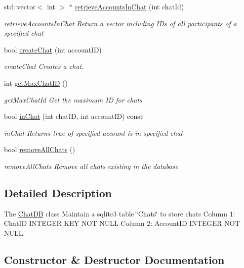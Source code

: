 \begin{DoxyCompactItemize}
std\+::vector$<$ int $>$ $\ast$ \hyperlink{classChatDB_af94ecd02f952a3a01b059f57651ac0a9}{retrieve\+Accounts\+In\+Chat} (int chat\+Id)
\begin{DoxyCompactList}\small\item\em retrieve\+Accounts\+In\+Chat Return a vector including ID\textquotesingle{}s of all participants of a specified chat \end{DoxyCompactList}\item 
bool \hyperlink{classChatDB_ad0a787b17322a88800bb38ba7500e1d9}{create\+Chat} (int account\+ID)
\begin{DoxyCompactList}\small\item\em create\+Chat Creates a chat. \end{DoxyCompactList}\item 
int \hyperlink{classChatDB_ac6af92de98926da877e606d67bf4fdec}{get\+Max\+Chat\+ID} ()
\begin{DoxyCompactList}\small\item\em get\+Max\+Chat\+Id Get the maximum ID for chats \end{DoxyCompactList}\item 
bool \hyperlink{classChatDB_a7a63614e4a31f1e6f4b5ce9f5d3261f0}{in\+Chat} (int chat\+ID, int account\+ID) const 
\begin{DoxyCompactList}\small\item\em in\+Chat Returns true of specified account is in specified chat \end{DoxyCompactList}\item 
bool \hyperlink{classChatDB_aa684136cc3342bec7e1f4fe5093ca9e7}{remove\+All\+Chats} ()
\begin{DoxyCompactList}\small\item\em remove\+All\+Chats Remove all chats existing in the database \end{DoxyCompactList}\end{DoxyCompactItemize}


\subsection{Detailed Description}
The \hyperlink{classChatDB}{Chat\+DB} class Maintain a sqlite3 table \char`\"{}\+Chats\char`\"{} to store chats Column 1\+: Chat\+ID I\+N\+T\+E\+G\+ER K\+EY N\+OT N\+U\+LL Column 2\+: Account\+ID I\+N\+T\+E\+G\+ER N\+OT N\+U\+LL. 

\subsection{Constructor \& Destructor Documentation}
